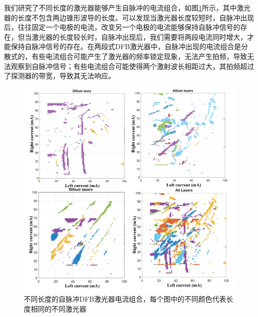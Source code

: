 我们研究了不同长度的激光器能够产生自脉冲的电流组合，如图\ref{laser_combination}所示，其中激光器的长度不包含两边锥形波导的长度。可以发现当激光器长度较短时，自脉冲出现后，往往固定一个电极的电流，改变另一个电极的电流能够保持自脉冲信号的存在，但当激光器的长度较长时，自脉冲出现后，我们需要将两段电流同时增大，才能保持自脉冲信号的存在。在两段式DFB激光器中，自脉冲出现的电流组合是分散式的，有些电流组合可能产生了激光器的频率锁定现象，无法产生拍频，导致无法观察到自脉冲信号；有些电流组合可能使得两个激射波长相距过大，其拍频超过了探测器的带宽，导致其无法响应。

\begin{figure}[htb]
	\centering
	\includegraphics[width=15cm]{./Pictures/laser_combination.jpg}
	\captionsetup{justification=centering}
	\caption{不同长度的自脉冲DFB激光器电流组合，每个图中的不同颜色代表长度相同的不同激光器}
	\label{laser_combination}
\end{figure}

